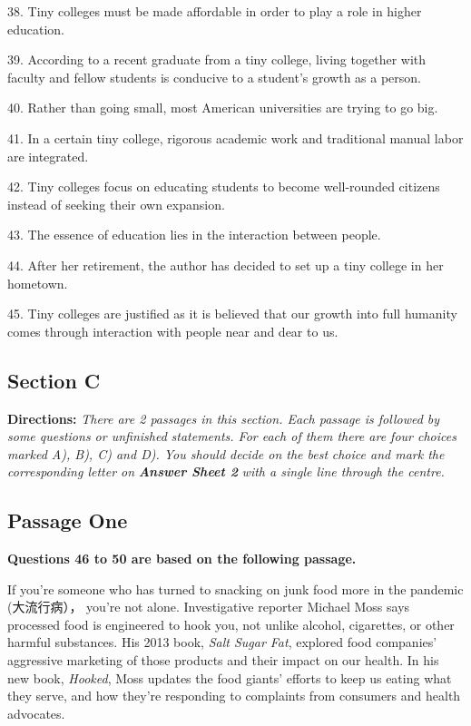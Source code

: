 \documentclass[UTF8,11pt]{ctexart}
\begin{document}
38. Tiny colleges must be made affordable in order to play a role in higher education.


39. According to a recent graduate from a tiny college, living together with faculty and fellow students is conducive to a student’s growth as a person.


40. Rather than going small, most American universities are trying to go big.


41. In a certain tiny college, rigorous academic work and traditional manual labor are integrated.


42. Tiny colleges focus on educating students to become well-rounded citizens instead of seeking their own expansion.


43. The essence of education lies in the interaction between people.


44. After her retirement, the author has decided to set up a tiny college in her hometown.


45. Tiny colleges are justified as it is believed that our growth into full humanity comes through interaction with people near and dear to us.


\subsection*{\textbf{Section C}}


\textbf{Directions: }\textit{There are 2 passages in this section. Each passage is followed by some questions or unfinished} \textit{statements. For each of them there are four choices marked A), B), C) and D). You should decide on the best} \textit{choice and mark the corresponding letter on }\textbf{\textit{Answer Sheet 2}}\textit{ with a single line through the centre.}


\subsection*{\textbf{Passage One}}


\textbf{Questions 46 to 50 are based on the following passage.}


If you’re someone who has turned to snacking on junk food more in the pandemic (大流行病）， you’re not alone. Investigative reporter Michael Moss says processed food is engineered to hook you, not unlike alcohol, cigarettes, or other harmful substances. His 2013 book, \textit{Salt Sugar Fat}, explored food companies’ aggressive marketing of those products and their impact on our health. In his new book, \textit{Hooked}, Moss updates the food giants’ efforts to keep us eating what they serve, and how they’re responding to complaints from consumers and health advocates.
\end{document}
